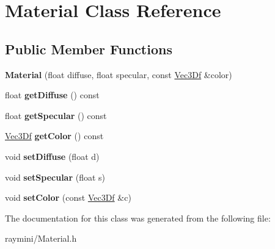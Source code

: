 \hypertarget{class_material}{
\section{Material Class Reference}
\label{class_material}
}
\subsection*{Public Member Functions}
\begin{DoxyCompactItemize}
\item 
\hypertarget{class_material_a6f4c1b3b6c16c6eb620f383fcbf6218c}{
{\bfseries Material} (float diffuse, float specular, const \hyperlink{class_vec3_d}{Vec3Df} \&color)}
\label{class_material_a6f4c1b3b6c16c6eb620f383fcbf6218c}

\item 
\hypertarget{class_material_adcdb21b40c66d4357620249053d9f5fa}{
float {\bfseries getDiffuse} () const }
\label{class_material_adcdb21b40c66d4357620249053d9f5fa}

\item 
\hypertarget{class_material_a9e098344c42b4f7cae2261493a28907d}{
float {\bfseries getSpecular} () const }
\label{class_material_a9e098344c42b4f7cae2261493a28907d}

\item 
\hypertarget{class_material_a1ce700a9471d85af491af127fd2e2438}{
\hyperlink{class_vec3_d}{Vec3Df} {\bfseries getColor} () const }
\label{class_material_a1ce700a9471d85af491af127fd2e2438}

\item 
\hypertarget{class_material_a1fbb936f30d31f89ffb7f0f673956c9a}{
void {\bfseries setDiffuse} (float d)}
\label{class_material_a1fbb936f30d31f89ffb7f0f673956c9a}

\item 
\hypertarget{class_material_a64c810f51cda4ea76b189172b2b51b2c}{
void {\bfseries setSpecular} (float s)}
\label{class_material_a64c810f51cda4ea76b189172b2b51b2c}

\item 
\hypertarget{class_material_af29e9b69f2ce692850a75d0c138304aa}{
void {\bfseries setColor} (const \hyperlink{class_vec3_d}{Vec3Df} \&c)}
\label{class_material_af29e9b69f2ce692850a75d0c138304aa}

\end{DoxyCompactItemize}


The documentation for this class was generated from the following file:\begin{DoxyCompactItemize}
\item 
raymini/Material.h\end{DoxyCompactItemize}
